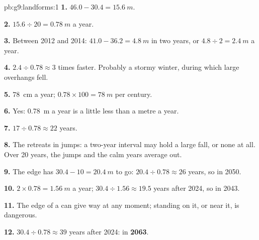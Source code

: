 \begin{solution}{pb:g9:landforms:1}
\textbf{1.} $46.0 - 30.4 = \qty{15.6}{m}$.

\textbf{2.} $15.6 \div 20 = \qty{0.78}{m}$ a year.

\textbf{3.} Between 2012 and 2014: $41.0 - 36.2 = \qty{4.8}{m}$ in two
years, or $4.8 \div 2 = \qty{2.4}{m}$ a year.

\textbf{4.} $2.4 \div 0.78 \approx 3$ times faster. Probably a stormy
winter, during which large overhangs fell.

\textbf{5.} \qty{78}{cm} a year; $0.78 \times 100 = \qty{78}{m}$ per
century.

\textbf{6.} Yes: \qty{0.78}{m} a year is a little less than a metre a year.

\textbf{7.} $17 \div 0.78 \approx 22$ years.

\textbf{8.} The  retreats in jumps: a two-year interval may hold a
large fall, or none at all. Over 20 years, the jumps and the calm years
average out.

\textbf{9.} The edge has $30.4 - 10 = \qty{20.4}{m}$ to go: $20.4 \div 0.78
\approx 26$ years, so in 2050.

\textbf{10.} $2 \times 0.78 = \qty{1.56}{m}$ a year; $30.4 \div 1.56
\approx 19.5$ years after 2024, so in 2043.

\textbf{11.} The edge of a  can give way at any moment; standing on
it, or near it, is dangerous.

\textbf{12.} $30.4 \div 0.78 \approx 39$ years after 2024: in
\textbf{2063}.
\end{solution}
